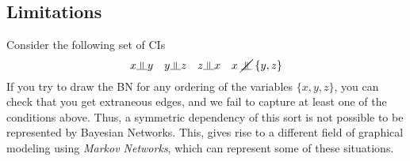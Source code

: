 \subsection{Limitations}
Consider the following set of CIs
\begin{equation}
	x \ind y \quad y \ind z \quad z \ind x \quad x \;\cancel\ind\; \{y, z\}
\end{equation}
If you try to draw the BN for any ordering of the variables $\{x, y, z\}$, you can check that you get extraneous edges, and we fail to capture at least one of the conditions above. Thus, a symmetric dependency of this sort is not possible to be represented by Bayesian Networks. This, gives rise to a different field of graphical modeling using \textit{Markov Networks}, which can represent some of these situations.
